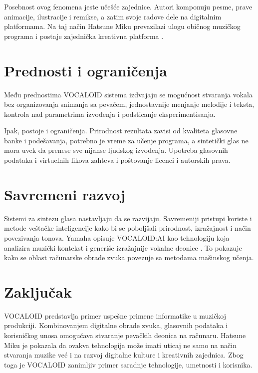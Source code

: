 \documentclass[12pt,a4paper]{article}
\begin{document}
Posebnost ovog fenomena jeste učešće zajednice. Autori komponuju pesme, prave animacije, ilustracije i remikse, a zatim svoje radove dele na digitalnim platformama. Na taj način Hatsune Miku prevazilazi ulogu običnog muzičkog programa i postaje zajednička kreativna platforma \cite{cryptonMiku,piapro}.

\section{Prednosti i ograničenja}
Među prednostima VOCALOID sistema izdvajaju se mogućnost stvaranja vokala bez organizovanja snimanja sa pevačem, jednostavnije menjanje melodije i teksta, kontrola nad parametrima izvođenja i podsticanje eksperimentisanja.

Ipak, postoje i ograničenja. Prirodnost rezultata zavisi od kvaliteta glasovne banke i podešavanja, potrebno je vreme za učenje programa, a sintetički glas ne mora uvek da prenese sve nijanse ljudskog izvođenja. Upotreba glasovnih podataka i virtuelnih likova zahteva i poštovanje licenci i autorskih prava.

\section{Savremeni razvoj}
Sistemi za sintezu glasa nastavljaju da se razvijaju. Savremeniji pristupi koriste i metode veštačke inteligencije kako bi se poboljšali prirodnost, izražajnost i način povezivanja tonova. Yamaha opisuje VOCALOID:AI kao tehnologiju koja analizira muzički kontekst i generiše izražajnije vokalne deonice \cite{yamahaAI}. To pokazuje kako se oblast računarske obrade zvuka povezuje sa metodama mašinskog učenja.

\section{Zaključak}
VOCALOID predstavlja primer uspešne primene informatike u muzičkoj produkciji. Kombinovanjem digitalne obrade zvuka, glasovnih podataka i korisničkog unosa omogućava stvaranje pevačkih deonica na računaru. Hatsune Miku je pokazala da ovakva tehnologija može imati uticaj ne samo na način stvaranja muzike već i na razvoj digitalne kulture i kreativnih zajednica. Zbog toga je VOCALOID zanimljiv primer saradnje tehnologije, umetnosti i korisnika.
\end{document}
